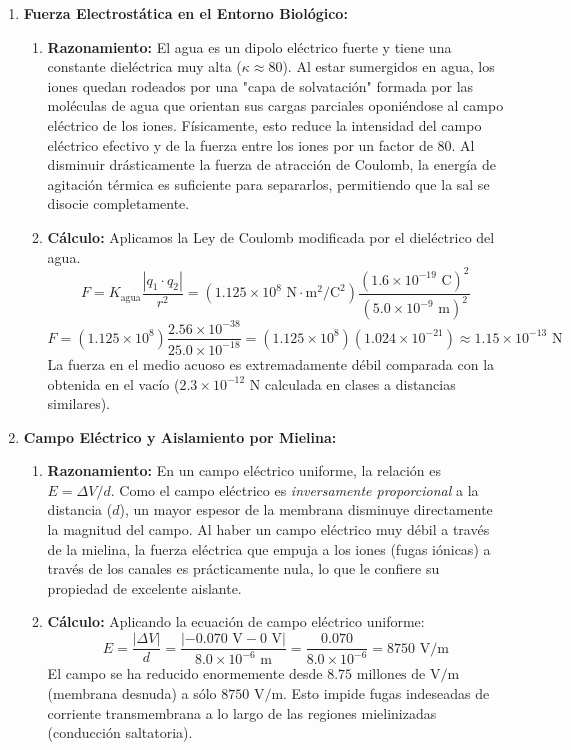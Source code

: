 \documentclass[11pt,letterpaper]{article}
\begin{document}
\begin{enumerate}[leftmargin=*]

    \item \textbf{Fuerza Electrostática en el Entorno Biológico:}
    \begin{enumerate}
        \item \textbf{Razonamiento:} El agua es un dipolo eléctrico fuerte y tiene una constante dieléctrica muy alta ($\kappa \approx 80$). Al estar sumergidos en agua, los iones quedan rodeados por una "capa de solvatación" formada por las moléculas de agua que orientan sus cargas parciales oponiéndose al campo eléctrico de los iones. Físicamente, esto reduce la intensidad del campo eléctrico efectivo y de la fuerza entre los iones por un factor de 80. Al disminuir drásticamente la fuerza de atracción de Coulomb, la energía de agitación térmica es suficiente para separarlos, permitiendo que la sal se disocie completamente.
        \item \textbf{Cálculo:} Aplicamos la Ley de Coulomb modificada por el dieléctrico del agua.
        \[
        F = K_{\text{agua}} \frac{|q_1 \cdot q_2|}{r^2} = (1.125 \times 10^8 \text{ N}\cdot\text{m}^2/\text{C}^2) \frac{(1.6 \times 10^{-19} \text{ C})^2}{(5.0 \times 10^{-9} \text{ m})^2}
        \]
        \[
        F = (1.125 \times 10^8) \frac{2.56 \times 10^{-38}}{25.0 \times 10^{-18}} = (1.125 \times 10^8)(1.024 \times 10^{-21}) \approx 1.15 \times 10^{-13} \text{ N}
        \]
        La fuerza en el medio acuoso es extremadamente débil comparada con la obtenida en el vacío ($2.3 \times 10^{-12} \text{ N}$ calculada en clases a distancias similares).
    \end{enumerate}

    \vspace{0.2cm}

    \item \textbf{Campo Eléctrico y Aislamiento por Mielina:}
    \begin{enumerate}
        \item \textbf{Razonamiento:} En un campo eléctrico uniforme, la relación es $E = \Delta V / d$. Como el campo eléctrico es \textit{inversamente proporcional} a la distancia ($d$), un mayor espesor de la membrana disminuye directamente la magnitud del campo. Al haber un campo eléctrico muy débil a través de la mielina, la fuerza eléctrica que empuja a los iones (fugas iónicas) a través de los canales es prácticamente nula, lo que le confiere su propiedad de excelente aislante.
        \item \textbf{Cálculo:} Aplicando la ecuación de campo eléctrico uniforme:
        \[
        E = \frac{|\Delta V|}{d} = \frac{|-0.070 \text{ V} - 0 \text{ V}|}{8.0 \times 10^{-6} \text{ m}} = \frac{0.070}{8.0 \times 10^{-6}} = 8750 \text{ V/m}
        \]
        El campo se ha reducido enormemente desde $8.75 \text{ millones de V/m}$ (membrana desnuda) a sólo $8750 \text{ V/m}$. Esto impide fugas indeseadas de corriente transmembrana a lo largo de las regiones mielinizadas (conducción saltatoria).
    \end{enumerate}


\end{enumerate}
\end{document}
